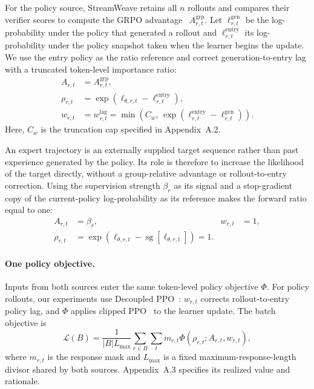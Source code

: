 \documentclass[letterpaper]{article}
\begin{document}
For the policy source, StreamWeave retains all $n$ rollouts and compares their verifier scores to compute the GRPO advantage~\citep{shao2024deepseekmath} $A^{\mathrm{grp}}_{r,t}$.
Let $\ell^{\mathrm{gen}}_{r,t}$ be the log-probability under the policy that generated a rollout and $\ell^{\mathrm{entry}}_{r,t}$ its log-probability under the policy snapshot taken when the learner begins the update.
We use the entry policy as the ratio reference and correct generation-to-entry lag with a truncated token-level importance ratio:
\begin{equation}
\begin{aligned}
A_{r,t}
&= A^{\mathrm{grp}}_{r,t},\\
\rho_{r,t}
&= \exp\!\left(
\ell_{\theta,r,t}-\ell^{\mathrm{entry}}_{r,t}
\right),\\
w_{r,t}
&= w^{\mathrm{lag}}_{r,t}
= \min\!\left(
C_w,\,
\exp\!\left(
\ell^{\mathrm{entry}}_{r,t}-\ell^{\mathrm{gen}}_{r,t}
\right)
\right).
\end{aligned}
\label{eq:policy-input}
\end{equation}
Here, $C_w$ is the truncation cap specified in Appendix~A.2.

An expert trajectory is an externally supplied target sequence rather than past experience generated by the policy.
Its role is therefore to increase the likelihood of the target directly, without a group-relative advantage or rollout-to-entry correction.
Using the supervision strength $\beta_r$ as its signal and a stop-gradient copy of the current-policy log-probability as its reference makes the forward ratio equal to one:
\begin{equation}
\begin{aligned}
A_{r,t} &= \beta_r,
& w_{r,t} &= 1,\\
\rho_{r,t}
&= \exp\!\left(
\ell_{\theta,r,t}-\operatorname{sg}[\ell_{\theta,r,t}]
\right)=1.
\end{aligned}
\label{eq:expert-input}
\end{equation}

\paragraph{One policy objective.}
Inputs from both sources enter the same token-level policy objective $\Phi$.
For policy rollouts, our experiments use Decoupled PPO~\citep{fu2025areal}: $w_{r,t}$ corrects rollout-to-entry policy lag, and $\Phi$ applies clipped PPO~\citep{schulman2017ppo} to the learner update.
The batch objective is
\begin{equation}
\mathcal{L}(B)=\frac{1}{|B|L_{\max}}
\sum_{r\in B}\sum_t m_{r,t}
\Phi\!\left(\rho_{r,t};A_{r,t},w_{r,t}\right),
\label{eq:primary-objective}
\end{equation}
where $m_{r,t}$ is the response mask and $L_{\max}$ is a fixed maximum-response-length divisor shared by both sources.
Appendix~A.3 specifies its realized value and rationale.
\end{document}

